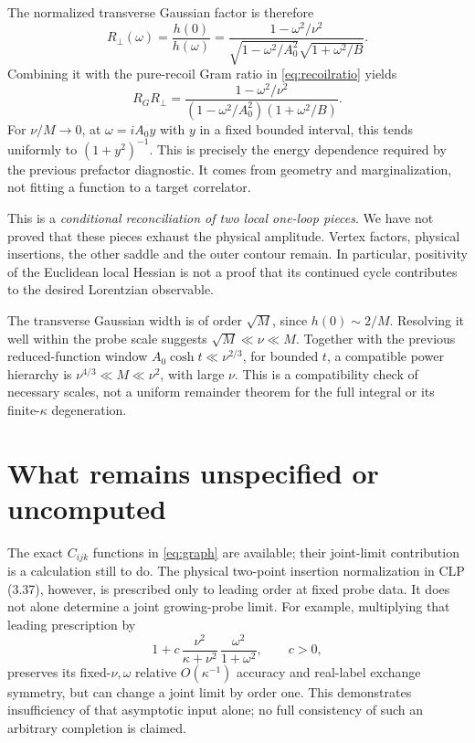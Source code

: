 \documentclass[11pt,a4paper]{article}
\begin{document}
The normalized transverse Gaussian factor is therefore
\begin{equation}
 R_\perp(\omega)=\frac{h(0)}{h(\omega)}
 =\frac{1-\omega^2/\nu^2}
 {\sqrt{1-\omega^2/A_0^2}\sqrt{1+\omega^2/B}}.
 \label{eq:RT}
\end{equation}
Combining it with the pure-recoil Gram ratio in
\eqref{eq:recoilratio} yields
\begin{equation}
 R_G R_\perp=
 \frac{1-\omega^2/\nu^2}
 {(1-\omega^2/A_0^2)(1+\omega^2/B)}.
 \label{eq:combined}
\end{equation}
For \(\nu/M\to0\), at \(\omega=iA_0 y\) with \(y\) in a fixed
bounded interval, this tends uniformly to \((1+y^2)^{-1}\).
This is precisely the energy dependence required by the previous
prefactor diagnostic. It comes from geometry and marginalization,
not fitting a function to a target correlator.

This is a \emph{conditional reconciliation of two local one-loop
pieces}. We have not proved that these pieces exhaust the physical
amplitude. Vertex factors, physical insertions, the other saddle and
the outer contour remain. In particular, positivity of the Euclidean
local Hessian is not a proof that its continued cycle contributes to the
desired Lorentzian observable.

The transverse Gaussian width is of order \(\sqrt M\), since
\(h(0)\sim2/M\). Resolving it well within the probe scale suggests
\(\sqrt M\ll\nu\ll M\). Together with the previous reduced-function
window \(A_0\cosh t\ll\nu^{2/3}\), for bounded \(t\), a compatible
power hierarchy is \(\nu^{4/3}\ll M\ll\nu^2\), with large \(\nu\).
This is a compatibility check of necessary scales, not a uniform
remainder theorem for the full integral or its finite-\(\kappa\)
degeneration.

\section{What remains unspecified or uncomputed}
The exact \(C_{ijk}\) functions in \eqref{eq:graph} are available;
their joint-limit contribution is a calculation still to do.
The physical two-point insertion normalization in CLP (3.37),
however, is prescribed only to leading order at fixed probe data.
It does not alone determine a joint growing-probe limit. For example,
multiplying that leading prescription by
\[
 1+c\,\frac{\nu^2}{\kappa+\nu^2}\,
             \frac{\omega^2}{1+\omega^2},\qquad c>0,
\]
preserves its fixed-\(\nu,\omega\) relative \(O(\kappa^{-1})\)
accuracy and real-label exchange symmetry, but can change a joint
limit by order one. This demonstrates insufficiency of that asymptotic
input alone; no full consistency of such an arbitrary completion is
claimed.
\end{document}
